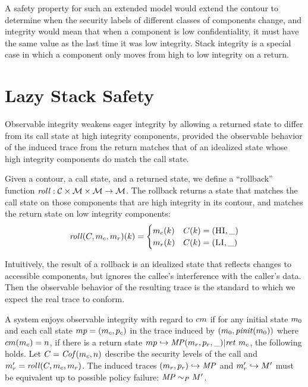 \documentclass[acmsmall,review,anonymous]{acmart}\settopmatter{printfolios=true,printccs=false,printacmref=false}
\begin{document}
    A safety property for such an extended model would extend the contour to
    determine when the security labels of different classes of components
    change, and integrity would mean that when a component is low
    confidentiality, it must have the same value as the last time it was low
    integrity. Stack integrity is a special case in which a component only
    moves from high to low integrity on a return.

\section{Lazy Stack Safety}


      Observable integrity weakens eager integrity by allowing a returned state
      to differ from its call state at high integrity components, provided the
      observable behavior of the induced trace from the return matches that of
      an idealized state whose high integrity components do match the call
      state.

      Given a contour, a call state, and a returned state, we define a
      ``rollback'' function \(\mathit{roll} : {\mathcal C} \times {\mathcal M} \times
      {\mathcal M} \rightarrow {\mathcal M}\). The rollback returns a state that matches
      the call state on those components that are high integrity in its
      contour, and matches the return state on low integrity components:
      \[\mathit{roll}(C,m_c,m_r)(k) =
      \begin{cases}
        m_c(k) & C(k) = (\textsc{HI},\_) \\
        m_r(k) & C(k) = (\textsc{LI},\_) \\
      \end{cases}\]

      Intuitively, the result of a rollback is an idealized state that
      reflects changes to accessible components, but ignores the callee's
      interference with the caller's data. Then the observable behavior of the
      resulting trace is the standard to which we expect the real trace to
      conform.

      A system enjoys observable integrity with regard to \(cm\) if
      for any initial state \(m_0\) and each call state \(mp =
      (m_c,p_c)\) in the trace induced by
      \((m_0,\mathit{pinit}(m_0))\) where \(cm(m_c)
      = n\), if there is a return state \(mp \hookrightarrow \mathit{MP}
      (m_r,p_r,\_) | \mathit{ret}\ m_c\), the following holds.
      Let \(C = \mathit{Cof}(m_c,n)\) describe the security levels
      of the call and \(m_r' = \mathit{roll}(C,m_c,m_r)\).
      The induced traces \((m_r,p_r) \hookrightarrow \mathit{MP}\)
      and \(m_r' \hookrightarrow M'\) must be equivalent up to
      possible policy failure: \(\mathit{MP} \sim_P M'\).
      
\end{document}
